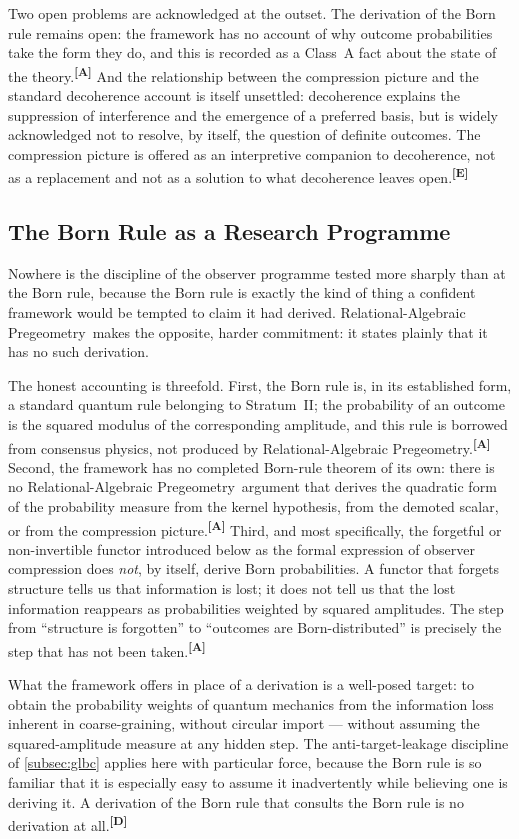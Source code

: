 \documentclass[12pt,a4paper,twoside]{article}
\theoremstyle{plain}
\theoremstyle{definition}
\theoremstyle{remark}
\newcommand{\ProjectShort}{Relational-Algebraic Pregeometry}
\newcommand{\RAP}{\ProjectShort}
\newcommand{\catmark}[1]{\textsuperscript{\textsf{\textbf{[#1]}}}}
\begin{document}
Two open problems are acknowledged at the outset. The derivation of the
Born rule remains open: the framework has no account of why outcome
probabilities take the form they do, and this is recorded as a Class~A
fact about the state of the theory.\catmark{A} And the relationship
between the compression picture and the standard decoherence account is
itself unsettled: decoherence explains the suppression of interference
and the emergence of a preferred basis, but is widely acknowledged not
to resolve, by itself, the question of definite outcomes. The
compression picture is offered as an interpretive companion to
decoherence, not as a replacement and not as a solution to what
decoherence leaves open.\catmark{E}

\subsection{The Born Rule as a Research Programme}
\label{subsec:born-rule}

Nowhere is the discipline of the observer programme tested more sharply
than at the Born rule, because the Born rule is exactly the kind of
thing a confident framework would be tempted to claim it had derived.
\RAP\ makes the opposite, harder commitment: it states plainly that it
has no such derivation.

The honest accounting is threefold. First, the Born rule is, in its
established form, a standard quantum rule belonging to Stratum~II; the
probability of an outcome is the squared modulus of the corresponding
amplitude, and this rule is borrowed from consensus physics, not
produced by \RAP.\catmark{A} Second, the framework has no completed
Born-rule theorem of its own: there is no \RAP\ argument that derives
the quadratic form of the probability measure from the kernel
hypothesis, from the demoted scalar, or from the compression
picture.\catmark{A} Third, and most specifically, the forgetful or
non-invertible functor introduced below as the formal expression of
observer compression does \emph{not}, by itself, derive Born
probabilities. A functor that forgets structure tells us that
information is lost; it does not tell us that the lost information
reappears as probabilities weighted by squared amplitudes. The step from
``structure is forgotten'' to ``outcomes are Born-distributed'' is
precisely the step that has not been taken.\catmark{A}

What the framework offers in place of a derivation is a well-posed
target: to obtain the probability weights of quantum mechanics from the
information loss inherent in coarse-graining, without circular import
--- without assuming the squared-amplitude measure at any hidden step.
The anti-target-leakage discipline of \cref{subsec:glbc} applies here
with particular force, because the Born rule is so familiar that it is
especially easy to assume it inadvertently while believing one is
deriving it. A derivation of the Born rule that consults the Born rule
is no derivation at all.\catmark{D}
\end{document}

